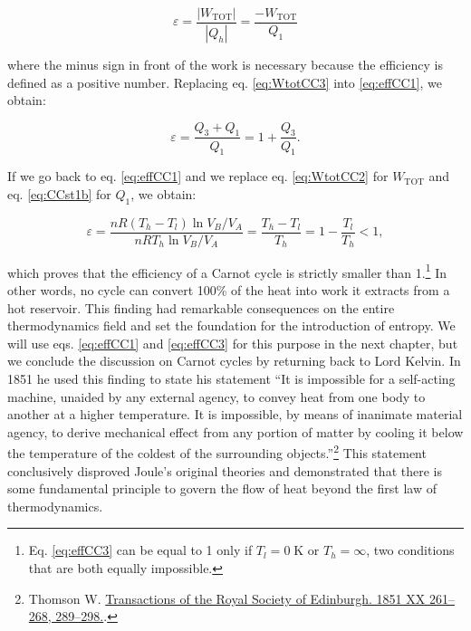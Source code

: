 \documentclass[
  9pt,
]{extbook}
\theoremstyle{definition}
\theoremstyle{definition}
\theoremstyle{definition}
\theoremstyle{definition}
\theoremstyle{remark}
\begin{document}
\begin{equation}
\varepsilon = \frac{\left| W_{\text{TOT}} \right|}{\left| Q_h \right|} =\frac{-W_{\text{TOT}}}{Q_1}
\label{eq:effCC1}
\end{equation}

where the minus sign in front of the work is necessary because the efficiency is defined as a positive number. Replacing eq. \eqref{eq:WtotCC3} into \eqref{eq:effCC1}, we obtain:

\begin{equation}
\varepsilon = \frac{Q_3+Q_1}{Q_1} = 1+\frac{Q_3}{Q_1}.
\label{eq:effCC2}
\end{equation}

If we go back to eq. \eqref{eq:effCC1} and we replace eq. \eqref{eq:WtotCC2} for \(W_{\mathrm{TOT}}\) and eq. \eqref{eq:CCst1b} for \(Q_1\), we obtain:

\begin{equation}
\varepsilon = \frac{nR \left( T_h - T_l \right) \ln V_B/V_A}{nRT_h \ln V_B/V_A} = \frac{T_h-T_l}{T_h}=1-\frac{T_l}{T_h }<1,
\label{eq:effCC3}
\end{equation}

which proves that the efficiency of a Carnot cycle is strictly smaller than 1.\footnote{Eq. \eqref{eq:effCC3} can be equal to 1 only if \(T_l=0 \; \text{K}\) or \(T_h=\infty\), two conditions that are both equally impossible.} In other words, no cycle can convert 100\% of the heat into work it extracts from a hot reservoir. This finding had remarkable consequences on the entire thermodynamics field and set the foundation for the introduction of entropy. We will use eqs. \eqref{eq:effCC1} and \eqref{eq:effCC3} for this purpose in the next chapter, but we conclude the discussion on Carnot cycles by returning back to Lord Kelvin. In 1851 he used this finding to state his statement ``It is impossible for a self-acting machine, unaided by any external agency, to convey heat from one body to another at a higher temperature. It is impossible, by means of inanimate material agency, to derive mechanical effect from any portion of matter by cooling it below the temperature of the coldest of the surrounding objects.''\footnote{Thomson W. \href{https://www.biodiversitylibrary.org/item/126047\#page/295/mode/1up}{Transactions of the Royal Society of Edinburgh. 1851 XX 261--268, 289--298.}.} This statement conclusively disproved Joule's original theories and demonstrated that there is some fundamental principle to govern the flow of heat beyond the first law of thermodynamics.
\end{document}

